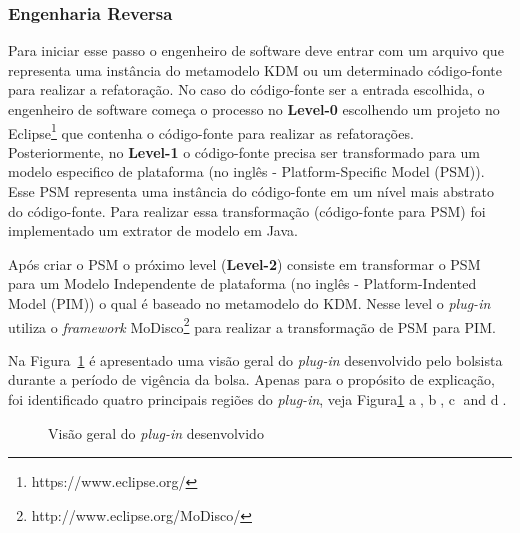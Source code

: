  \subsubsection{Engenharia Reversa}

Para iniciar esse passo o engenheiro de software deve entrar com um arquivo que representa uma instância do metamodelo KDM ou um determinado código-fonte para realizar a refatoração. No caso do código-fonte ser a entrada escolhida, o engenheiro de software começa o processo no \textbf{Level-0} escolhendo um projeto no Eclipse\footnote{https://www.eclipse.org/} que contenha o código-fonte para realizar as refatorações. Posteriormente, no \textbf{Level-1} o código-fonte precisa ser transformado para um modelo especifico de plataforma (no inglês - Platform-Specific Model (PSM)). Esse PSM representa uma instância do código-fonte em um nível mais abstrato do código-fonte. Para realizar essa transformação (código-fonte para PSM) foi implementado um extrator de modelo em Java.

Após criar o PSM o próximo level (\textbf{Level-2}) consiste em transformar o PSM para um Modelo Independente de plataforma (no inglês - Platform-Indented Model (PIM)) o qual é baseado no metamodelo do KDM. Nesse level o \textit{plug-in} utiliza o \textit{framework} MoDisco\footnote{http://www.eclipse.org/MoDisco/} para realizar a transformação de PSM para PIM.

Na Figura~\ref{fig:plugin} é apresentado uma visão geral do \textit{plug-in} desenvolvido pelo bolsista durante a período de vigência da bolsa. Apenas para o propósito de explicação, foi identificado quatro principais regiões do \textit{plug-in}, veja Figura\ref{fig:plugin} \textcircled{a}, \textcircled{b}, \textcircled{c} and \textcircled{d}.

\begin{figure}[!h]
 \centering
\caption{Visão geral do \textit{plug-in} desenvolvido}
 \label{fig:plugin}
\end{figure}

